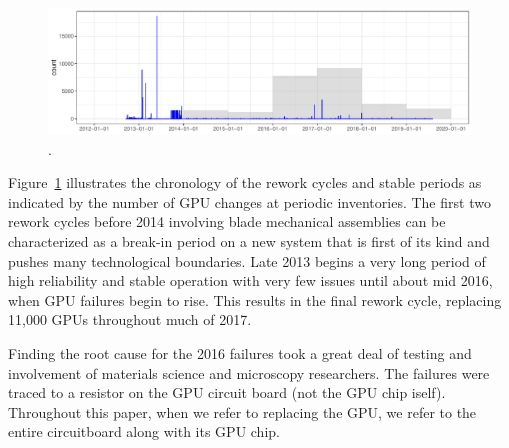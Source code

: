 \begin{figure}[tb]
  \centering
  \includegraphics[width=\textwidth]{figs/chronology001.pdf}
  \caption{.}
  \label{fig:chronology}
\end{figure}
Figure~\ref{fig:chronology} illustrates the chronology of the rework
cycles and stable periods as indicated by the number of GPU changes at
periodic inventories. The first two rework cycles before 2014
involving blade mechanical assemblies can be characterized as a
break-in period on a new system that is first of its kind and pushes
many technological boundaries.  Late 2013 begins a very
long period of high reliability and stable operation with very few
issues until about mid 2016, when GPU failures begin to rise. This
results in the final rework cycle, replacing 11,000 GPUs throughout
much of 2017.

Finding the root cause for the 2016 failures took a great deal of
testing and involvement of materials science and microscopy
researchers. The failures were traced to a resistor on the GPU
circuit board (not the GPU chip iself). Throughout this paper, when we
refer to replacing the GPU, we refer to the entire circuitboard along
with its GPU chip.

